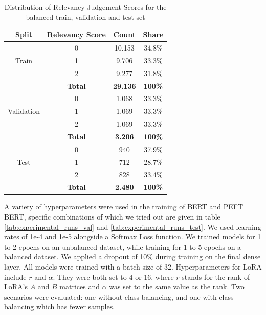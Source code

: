 \documentclass[sigconf, natbib=true]{acmart}
\begin{document}
\begin{table}[]
\caption{Distribution of Relevancy Judgement Scores for the balanced train, validation and test set}
\label{tab:train_val_test_spilt_balanced}
\begin{tabular}{c c c c}
\hline
\textbf{Split}                       & \textbf{Relevancy Score} & \textbf{Count} & \textbf{Share} \\ \hline
\multirow{3}{*}{Train}      & 0               & 10.153 & 34.8\%  \\ \cline{2-4} 
                            & 1               & 9.706  & 33.3\%  \\ \cline{2-4} 
                            & 2               & 9.277  & 31.8\%  \\ \cline{2-4} 
                            & \textbf{Total}           & \textbf{29.136} & \textbf{100\%}   \\ \hline
\multirow{3}{*}{Validation} & 0               & 1.068  & 33.3\%  \\ \cline{2-4} 
                            & 1               & 1.069  & 33.3\%  \\ \cline{2-4} 
                            & 2               & 1.069  & 33.3\%  \\ \cline{2-4} 
                            & \textbf{Total}           & \textbf{3.206}  & \textbf{100\%}   \\ \hline
\multirow{3}{*}{Test}       & 0               & 940   & 37.9\%  \\ \cline{2-4} 
                            & 1               & 712   & 28.7\%  \\ \cline{2-4} 
                            & 2               & 828   & 33.4\%  \\ \cline{2-4} 
                            & \textbf{Total}           & \textbf{2.480}  & \textbf{100\%}   \\ \hline
\end{tabular}
\end{table}

A variety of hyperparameters were used in the training of BERT and PEFT BERT, specific combinations of which we tried out are given in table \ref{tab:experimental_runs_val} and \ref{tab:experimental_runs_test}.
We used learning rates of 1e-4 and 1e-5 alongside a Softmax Loss function.
We trained models for 1 to 2 epochs on an unbalanced dataset, while training for 1 to 5 epochs on a balanced dataset.
We applied a dropout of 10\% during training on the final dense layer. All models were trained with a batch size of 32. 
Hyperparameters for LoRA include $r$ and $\alpha$. 
They were both set to 4 or 16, where $r$ stands for the rank of LoRA's $A$ and $B$ matrices and $\alpha$ was set to the same value as the rank.
Two scenarios were evaluated: one without class balancing, and one with class balancing which has fewer samples.
\end{document}
